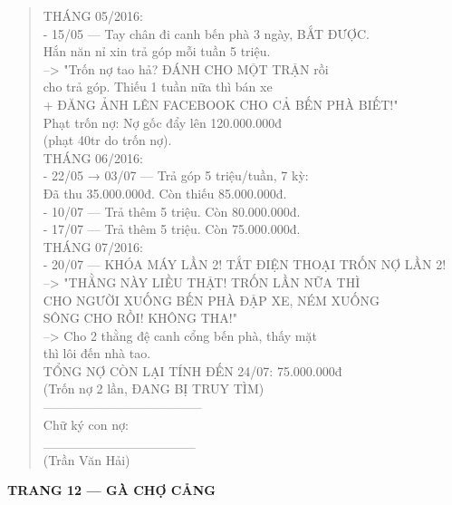 \documentclass[12pt,a4paper]{article}
\begin{document}
\begin{quote}
\vspace{0.2cm}
THÁNG 05/2016:\\
- 15/05 --- Tay chân đi canh bến phà 3 ngày, BẮT ĐƯỢC.\\
          Hắn năn nỉ xin trả góp mỗi tuần 5 triệu.\\
          --> "Trốn nợ tao hả? ĐÁNH CHO MỘT TRẬN rồi\\
               cho trả góp. Thiếu 1 tuần nữa thì bán xe\\
               + ĐĂNG ẢNH LÊN FACEBOOK CHO CẢ BẾN PHÀ BIẾT!"\\
          Phạt trốn nợ: Nợ gốc đẩy lên 120.000.000đ\\
          (phạt 40tr do trốn nợ).\\
\vspace{0.2cm}
THÁNG 06/2016:\\
- 22/05 → 03/07 --- Trả góp 5 triệu/tuần, 7 kỳ:\\
          Đã thu 35.000.000đ. Còn thiếu 85.000.000đ.\\
- 10/07 --- Trả thêm 5 triệu. Còn 80.000.000đ.\\
- 17/07 --- Trả thêm 5 triệu. Còn 75.000.000đ.\\
\vspace{0.2cm}
THÁNG 07/2016:\\
- 20/07 --- KHÓA MÁY LẦN 2! TẮT ĐIỆN THOẠI TRỐN NỢ LẦN 2!\\
          --> "THẰNG NÀY LIỀU THẬT! TRỐN LẦN NỮA THÌ\\
               CHO NGƯỜI XUỐNG BẾN PHÀ ĐẬP XE, NÉM XUỐNG\\
               SÔNG CHO RỒI! KHÔNG THA!"\\
          --> Cho 2 thằng đệ canh cổng bến phà, thấy mặt\\
              thì lôi đến nhà tao.\\
\vspace{0.2cm}
TỔNG NỢ CÒN LẠI TÍNH ĐẾN 24/07: 75.000.000đ\\
(Trốn nợ 2 lần, ĐANG BỊ TRUY TÌM)\\
--------------------------------------\\
Chữ ký con nợ:\\
\vspace{0.2cm}
\_\_\_\_\_\_\_\_\_\_\_\_\_\_\_\_\\
(Trần Văn Hải)\\
\end{quote}




\vspace{0.35cm}\noindent\textbf{\large TRANG 12 — GÀ CHỢ CẢNG}\\[0.15cm]
\end{document}
